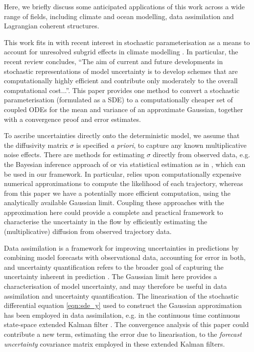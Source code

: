 Here, we briefly discuss some anticipated applications of this work across a wide range of fields, including climate and ocean modelling, data assimilation and Lagrangian coherent structures.

This work fits in with recent interest in stochastic parameterisation as a means to account for unresolved subgrid effects in climate modelling \cite{BernerEtAl_2017_StochasticParameterizationNew,LeutbecherEtAl_2017_StochasticRepresentationsModel,Palmer_2019_StochasticWeatherClimate}.
In particular, the recent review \cite{LeutbecherEtAl_2017_StochasticRepresentationsModel} concludes, ``The aim of current and future developments in stochastic representations of model uncertainty is to develop schemes that are computationally highly efficient and contribute only moderately to the overall computational cost...''.
This paper provides one method to convert a stochastic parameterisation (formulated as a SDE) to a computationally cheaper set of coupled ODEs for the mean and variance of an approximate Gaussian, together with a convergence proof and error estimates.

To ascribe uncertainties directly onto the deterministic model, we assume that the diffusivity matrix \(\sigma\) is specified \textit{a priori}, to capture any known multiplicative noise effects.
There are methods for estimating \(\sigma\) directly from observed data, e.g. the Bayesian inference approach of \cite{YingEtAl_2019_BayesianInferenceOcean} or via statistical estimation as in \cite{CotterPavliotis_2009_EstimatingEddyDiffusivities}, which can be used in our framework.
In particular, \cite{YingEtAl_2019_BayesianInferenceOcean} relies upon computationally expensive numerical approximations to compute the likelihood of each trajectory, whereas from this paper we have a potentially more efficient computation, using the analytically available Gaussian limit.
Coupling these approaches with the approximation here could provide a complete and practical framework to characterise the uncertainty in the flow by efficiently estimating the (multiplicative) diffusion from observed trajectory data.

Data assimilation is a framework for improving uncertainties in predictions by combining model forecasts with observational data, accounting for error in both, and uncertainty quantification refers to the broader goal of capturing the uncertainty inherent in prediction \cite{BudhirajaEtAl_2019_AssimilatingDataModels,Jazwinski_2014_StochasticProcessesFiltering,LawEtAl_2015_DataAssimilationMathematical,ReichCotter_2015_ProbabilisticForecastingBayesian}.
The Gaussian limit here provides a characterisation of model uncertainty, and may therefore be useful in data assimilation and uncertainty quantification.
The linearisation of the stochastic differential equation \eqref{eqn:sde_y} used to construct the Gaussian approximation has been employed in data assimilation, e.g. in the continuous time continuous state-space extended Kalman filter \cite[\S 9]{Jazwinski_2014_StochasticProcessesFiltering}. The convergence analysis of this paper could contribute a new term, estimating the error due to linearisation, to the \emph{forecast uncertainty} covariance matrix employed in these extended Kalman filters.

